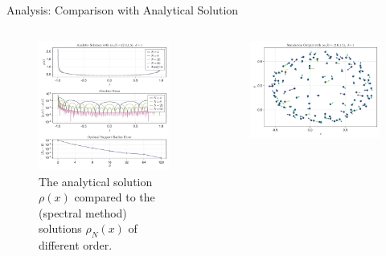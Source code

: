 \documentclass[aspectratio=169, hyperref={colorlinks=true}]{beamer}
\begin{document}
  \begin{frame}{Analysis: Comparison with Analytical Solution}
    \begin{columns}[t]
      \begin{column}{0.6\textwidth}
        \begin{figure}[H]
          \centering
          \includegraphics[width=\linewidth, trim={0 6.35cm 0 0}, clip]{results/known-analytic/analytic-solution.pdf}
          \caption[Comparison with analytical solutions and error]{
            The analytical solution $\rho(x)$ compared to the (spectral method) solutions $\rho_N(x)$ of different order.
          }
          \label{fig:analytic-solution}
        \end{figure}
      \end{column}
      \begin{column}{0.4\textwidth}
        \vspace{1.5mm}
        \begin{figure}[H]
          \centering
          \includegraphics[width=\linewidth]{results/known-analytic/simulation-quiver.pdf}

\end{figure}
\end{column}
\end{columns}
\end{frame}
\end{document}
